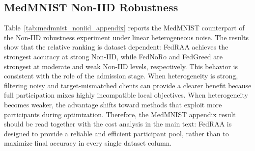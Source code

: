 \documentclass[conference]{IEEEtran}
\theoremstyle{definition}
\theoremstyle{remark}
\begin{document}
\subsection{MedMNIST Non-IID Robustness}

Table~\ref{tab:medmnist_noniid_appendix} reports the MedMNIST counterpart of the Non-IID robustness experiment under linear heterogeneous noise.
The results show that the relative ranking is dataset dependent: FedRAA achieves the strongest accuracy at strong Non-IID, while FedNoRo and FedGreed are strongest at moderate and weak Non-IID levels, respectively.
This behavior is consistent with the role of the admission stage.
When heterogeneity is strong, filtering noisy and target-mismatched clients can provide a clearer benefit because full participation mixes highly incompatible local objectives.
When heterogeneity becomes weaker, the advantage shifts toward methods that exploit more participants during optimization.
Therefore, the MedMNIST appendix result should be read together with the cost analysis in the main text: FedRAA is designed to provide a reliable and efficient participant pool, rather than to maximize final accuracy in every single dataset column.
\end{document}
